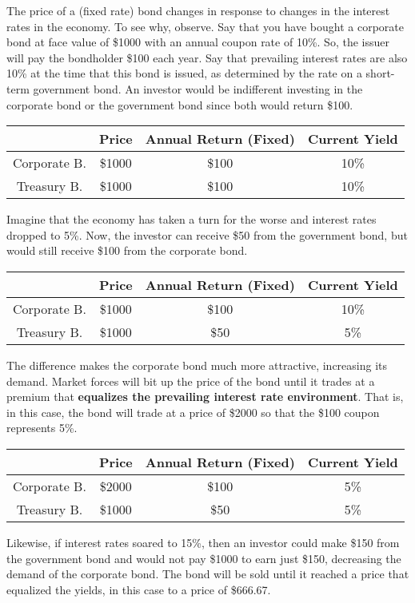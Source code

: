 \documentclass{article}
\begin{document}
    The price of a (fixed rate) bond changes in response to changes in the interest rates in the economy. To see why, observe. Say that you have bought a corporate bond at face value of \$1000 with an annual coupon rate of 10\%. So, the issuer will pay the bondholder \$100 each year. Say that prevailing interest rates are also 10\% at the time that this bond is issued, as determined by the rate on a short-term government bond. An investor would be indifferent investing in the corporate bond or the government bond since both would return \$100. 

    \begin{center}
    \begin{tabular}{c|c|c|c}
       & Price & Annual Return (Fixed) & Current Yield\\
       \hline
      Corporate B. & \$1000 & \$100 & 10\% \\
      Treasury B. & \$1000 & \$100 & 10\%
    \end{tabular}
    \end{center}
    Imagine that the economy has taken a turn for the worse and interest rates dropped to 5\%. Now, the investor can receive \$50 from the government bond, but would still receive \$100 from the corporate bond. 
    \begin{center}
    \begin{tabular}{c|c|c|c}
       & Price & Annual Return (Fixed) & Current Yield \\
       \hline
      Corporate B. & \$1000 & \$100 & 10\% \\
      Treasury B. & \$1000 & \$50 & 5\%
    \end{tabular}
    \end{center}
    The difference makes the corporate bond much more attractive, increasing its demand. Market forces will bit up the price of the bond until it trades at a premium that \textbf{equalizes the prevailing interest rate environment}. That is, in this case, the bond will trade at a price of \$2000 so that the \$100 coupon represents 5\%. 
    \begin{center}
    \begin{tabular}{c|c|c|c}
       & Price & Annual Return (Fixed) & Current Yield \\
       \hline
      Corporate B. & \$2000 & \$100 & 5\% \\
      Treasury B. & \$1000 & \$50 & 5\%
    \end{tabular}
    \end{center}
    Likewise, if interest rates soared to 15\%, then an investor could make \$150 from the government bond and would not pay \$1000 to earn just \$150, decreasing the demand of the corporate bond. The bond will be sold until it reached a price that equalized the yields, in this case to a price of \$666.67. 
\end{document}
